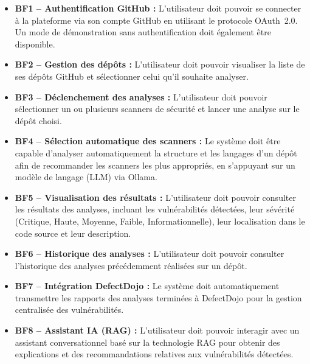 \documentclass[12pt, a4paper, oneside]{report}
\begin{document}
\begin{itemize}
    \item \textbf{BF1 -- Authentification GitHub :} L'utilisateur doit pouvoir
    se connecter à la plateforme via son compte GitHub en utilisant le protocole
    OAuth~2.0. Un mode de démonstration sans authentification doit également être
    disponible.
    
    \item \textbf{BF2 -- Gestion des dépôts :} L'utilisateur doit pouvoir
    visualiser la liste de ses dépôts GitHub et sélectionner celui qu'il souhaite
    analyser.
    
    \item \textbf{BF3 -- Déclenchement des analyses :} L'utilisateur doit pouvoir
    sélectionner un ou plusieurs scanners de sécurité et lancer une analyse sur
    le dépôt choisi.
    
    \item \textbf{BF4 -- Sélection automatique des scanners :} Le système doit
    être capable d'analyser automatiquement la structure et les langages d'un
    dépôt afin de recommander les scanners les plus appropriés, en s'appuyant
    sur un modèle de langage (LLM) via Ollama.
    
    \item \textbf{BF5 -- Visualisation des résultats :} L'utilisateur doit pouvoir
    consulter les résultats des analyses, incluant les vulnérabilités détectées,
    leur sévérité (Critique, Haute, Moyenne, Faible, Informationnelle), leur
    localisation dans le code source et leur description.
    
    \item \textbf{BF6 -- Historique des analyses :} L'utilisateur doit pouvoir
    consulter l'historique des analyses précédemment réalisées sur un dépôt.
    
    \item \textbf{BF7 -- Intégration DefectDojo :} Le système doit automatiquement
    transmettre les rapports des analyses terminées à DefectDojo pour la gestion
    centralisée des vulnérabilités.
    
    \item \textbf{BF8 -- Assistant IA (RAG) :} L'utilisateur doit pouvoir
    interagir avec un assistant conversationnel basé sur la technologie RAG pour
    obtenir des explications et des recommandations relatives aux vulnérabilités
    détectées.
\end{itemize}

\end{document}
